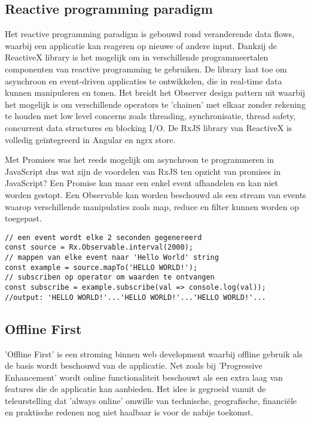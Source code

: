 \subsection{Reactive programming paradigm}
\label{subsec:reactive-programming}
Het reactive programming paradigm \autocite{reactivex-intro} is gebouwd rond veranderende data flows, waarbij een applicatie kan reageren op nieuwe of andere input. Dankzij de ReactiveX library is het mogelijk om in verschillende programmeertalen componenten van reactive programming te gebruiken. De library laat toe om asynchroon en event-driven applicaties te ontwikkelen, die in real-time data kunnen manipuleren en tonen. Het breidt het Observer design pattern uit waarbij het mogelijk is om verschillende operators te 'chainen' met elkaar zonder rekening te houden met low level concerns zoals threading, synchronisatie, thread safety, concurrent data structures en blocking I/O. De RxJS library van ReactiveX is volledig ge\"integreerd in Angular en ngrx store.

Met Promises \autocite{promise-info} was het reeds mogelijk om asynchroon te programmeren in JavaScript dus wat zijn de voordelen van RxJS ten opzicht van promises in JavaScript? Een Promise kan maar een enkel event afhandelen en kan niet worden gestopt. Een Observable kan worden beschouwd als een stream van events waarop verschillende manipulaties zoals map, reduce en filter kunnen worden op toegepast.
\begin{lstlisting}[caption=Voorbeeld de mapTo operator in RxJS]
// een event wordt elke 2 seconden gegenereerd
const source = Rx.Observable.interval(2000);
// mappen van elke event naar 'Hello World' string
const example = source.mapTo('HELLO WORLD!');
// subscriben op operator om waarden te ontvangen
const subscribe = example.subscribe(val => console.log(val));
//output: 'HELLO WORLD!'...'HELLO WORLD!'...'HELLO WORLD!'...

\end{lstlisting}
\subsection{Offline First}
'Offline First' is een stroming \autocite{offline-first} binnen web development waarbij offline gebruik als de basis wordt beschouwd van de applicatie. Net zoals bij 'Progressive Enhancement' wordt online functionaliteit beschouwt als een extra laag van features die de applicatie kan aanbieden. Het idee is gegroeid vanuit de teleurstelling dat 'always online' omwille van technische, geografische, financi\"ele en praktische redenen nog niet haalbaar is voor de nabije toekomst.
\clearpage
